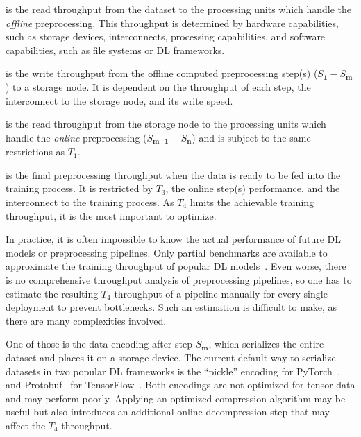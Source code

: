 \begin{description}[align=left]
\item[$T_1$] is the read throughput from the dataset to the processing units which handle the \textit{offline} preprocessing.
This throughput is determined by hardware capabilities, such as storage devices, interconnects, processing capabilities, and software capabilities, such as file systems or DL frameworks.

\item[$T_2$] is the write throughput from the offline computed preprocessing step(s) ($S_{\textbf{1}}-S_{\textbf{m}}$) to a storage node.
It is dependent on the throughput of each step, the interconnect to the storage node, and its write speed.

\item[$T_3$] is the read throughput from the storage node to the processing units which handle the \textit{online} preprocessing ($S_{\textbf{m+1}}-S_{\textbf{n}}$) and is subject to the same restrictions as $T_1$.

\item[$T_4$] is the final preprocessing throughput when the data is ready to be fed into the training process.
It is restricted by $T_{3}$, the online step(s) performance, and the interconnect to the training process.
As $T_4$ limits the achievable training throughput, it is the most important to optimize.
\end{description}

In practice, it is often impossible to know the actual performance of future DL models or preprocessing pipelines. 
Only partial benchmarks are available to approximate the training throughput of popular DL models~\cite{nvidiabenchmarks2020}.
Even worse, there is no comprehensive throughput analysis of preprocessing pipelines, so one has to estimate the resulting $T_4$ throughput of a pipeline manually for every single deployment to prevent bottlenecks.
Such an estimation is difficult to make, as there are many complexities involved.

One of those is the data encoding after step $S_{\textbf{m}}$, which serializes the entire dataset and places it on a storage device.
The current default way to serialize datasets in two popular DL frameworks is the ``pickle'' encoding for PyTorch~\cite{paszke2019pytorch}, and Protobuf~\cite{protobuf} for TensorFlow~\cite{abadi2016tensorflow}. Both encodings are not optimized for tensor data and may perform poorly. Applying an optimized compression algorithm may be useful but also introduces an additional online decompression step that may affect the $T_4$ throughput.

